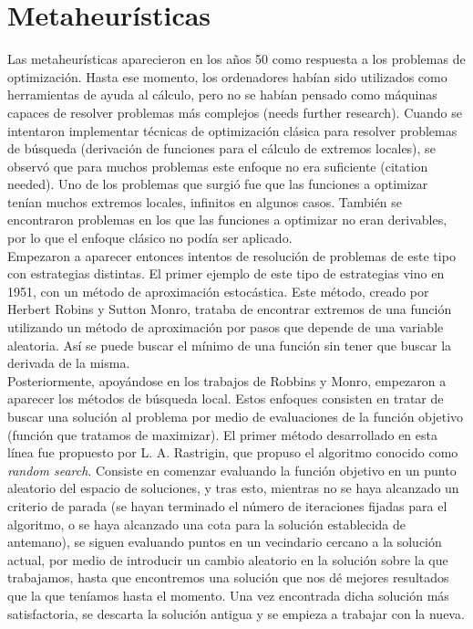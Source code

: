 \documentclass[12pt]{article} \usepackage[utf8]{inputenc}
\begin{document}
\section{Metaheurísticas}

Las metaheurísticas aparecieron en los años 50 como respuesta a los
problemas de optimización. Hasta ese momento, los ordenadores habían
sido utilizados como herramientas de ayuda al cálculo, pero no se
habían pensado como máquinas capaces de resolver problemas más
complejos (needs further research). Cuando se intentaron implementar
técnicas de optimización clásica para resolver problemas de búsqueda
(derivación de funciones para el cálculo de extremos locales), se
observó que para muchos problemas este enfoque no era suficiente
(citation needed). Uno de los problemas que surgió fue que las
funciones a optimizar tenían muchos extremos locales, infinitos en
algunos casos. También se encontraron problemas en los que las
funciones a optimizar no eran derivables, por lo que el enfoque
clásico no podía
ser aplicado.\\

Empezaron a aparecer entonces intentos de resolución de problemas de
este tipo con estrategias distintas. El primer ejemplo de este tipo de
estrategias vino en 1951, con un método de aproximación estocástica.
Este método, creado por Herbert Robins y Sutton Monro, trataba de
encontrar extremos de una función utilizando un método de aproximación
por pasos que depende de una variable aleatoria. Así se puede buscar
el mínimo de una función sin tener que buscar la derivada de la misma.\\

Posteriormente, apoyándose en los trabajos de Robbins y Monro,
empezaron a aparecer los métodos de búsqueda local. Estos enfoques
consisten en tratar de buscar una solución al problema por medio de
evaluaciones de la función objetivo (función que tratamos de
maximizar). El primer método desarrollado en esta línea fue propuesto
por L. A. Rastrigin, que propuso el algoritmo conocido como
\textit{random search}. Consiste en comenzar evaluando la función
objetivo en un punto aleatorio del espacio de soluciones, y tras esto,
mientras no se haya alcanzado un criterio de parada (se hayan
terminado el número de iteraciones fijadas para el algoritmo, o se
haya alcanzado una cota para la solución establecida de antemano), se
siguen evaluando puntos en un vecindario cercano a la solución actual,
por medio de introducir un cambio aleatorio en la solución sobre la
que trabajamos, hasta que encontremos una solución que nos dé mejores
resultados que la que teníamos hasta el momento. Una vez encontrada
dicha solución más satisfactoria, se descarta la solución antigua
y se empieza a trabajar con la nueva.\\
\end{document}
